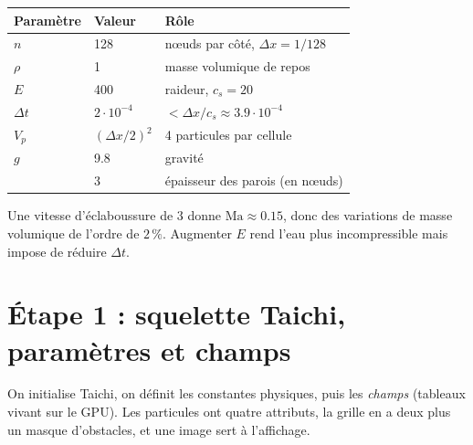 \documentclass[11pt,a4paper]{article}
\newcommand{\code}[1]{\texttt{\detokenize{#1}}}
\begin{document}
\begin{center}
\begin{tabular}{@{}lll@{}}
\toprule
Paramètre & Valeur & Rôle \\
\midrule
$n$ & 128 & n\oe uds par côté, $\Delta x = 1/128$ \\
$\rho$ & 1 & masse volumique de repos \\
$E$ & 400 & raideur, $c_s = 20$ \\
$\Delta t$ & $2\cdot10^{-4}$ & $< \Delta x / c_s \approx 3.9\cdot10^{-4}$ \\
$V_p$ & $(\Delta x/2)^2$ & 4 particules par cellule \\
$g$ & 9.8 & gravité \\
\code{bound} & 3 & épaisseur des parois (en n\oe uds) \\
\bottomrule
\end{tabular}
\end{center}

Une vitesse d'éclaboussure de $3$ donne $\mathrm{Ma} \approx 0.15$, donc des variations de masse
volumique de l'ordre de $2\,\%$. Augmenter $E$ rend l'eau plus incompressible mais impose
de réduire $\Delta t$.

\section{Étape 1 : squelette Taichi, paramètres et champs}

On initialise Taichi, on définit les constantes physiques, puis les \emph{champs} (tableaux
vivant sur le GPU). Les particules ont quatre attributs, la grille en a deux plus un masque
d'obstacles, et une image sert à l'affichage.
\end{document}
